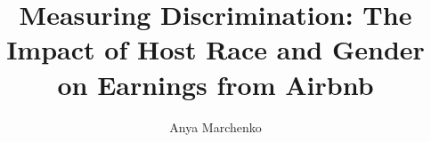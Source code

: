 \documentclass[11pt, oneside]{article}
\begin{document}

\begin{comment}
Options for first sentence of abstract:
\begin{enumerate}
\item The extent of discrimination on Airbnb, especially against hosts, remains poorly researched. 
\item Despite well-publicized efforts by Airbnb to address discrimination on its platform, the discrimination against hosts remains poorly measured by economists. 
\item Even though discrimination against hosts on Airbnb carries serious economic consequences for agents, the issue has remained poorly researched. 
\item Measuring discrimination is challenging because in the absence of an experiment, it requires controlling for an extensive set of covariates. 
\item Little research has been done on the extent of discrimination against hosts on Airbnb because of data restrictions, and difficulty of setting up an experiment. 
\end{enumerate}
\end{comment}


\title{Measuring Discrimination: The Impact of Host Race and Gender on Earnings from Airbnb}
\author{Anya Marchenko}
\maketitle
\end{document}

